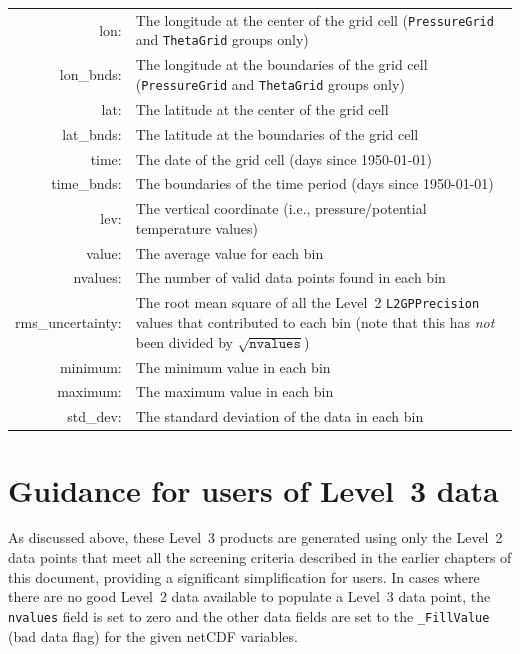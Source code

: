 \vspace{\baselineskip}\noindent\begin{tabular}{>{\ttfamily}r>{\raggedright}p{4.9in}}
  lon: & The longitude at the center of the grid cell
  (\texttt{PressureGrid} and \texttt{ThetaGrid} groups
  only)\tabularnewline

  lon\_bnds: & The longitude at the boundaries of the grid cell
  (\texttt{PressureGrid} and \texttt{ThetaGrid} groups
  only)\tabularnewline

  lat: & The latitude at the center of the grid cell\tabularnewline

  lat\_bnds: & The latitude at the boundaries of the grid
  cell\tabularnewline

  time: & The date of the grid cell (days since
  1950-01-01)\tabularnewline

  time\_bnds: & The boundaries of the time period (days since
  1950-01-01)\tabularnewline

  lev: & The vertical coordinate (i.e., pressure/potential temperature
  values)\tabularnewline

  value: & The average value for each bin\tabularnewline

  nvalues: & The number of valid data points found in each
  bin\tabularnewline

  rms\_uncertainty: & The root mean square of all the Level~2
  \texttt{L2GPPrecision} values that contributed to each bin (note
  that this has \emph{not} been divided by
  $\sqrt{\texttt{nvalues}}$)\tabularnewline

  minimum: & The minimum value in each bin\tabularnewline

  maximum: & The maximum value in each bin\tabularnewline

  std\_dev: & The standard deviation of the data in each
  bin\tabularnewline

\end{tabular}

\section{Guidance for users of Level~3 data}

As discussed above, these Level~3 products are generated using only the Level~2 data points that meet all the screening criteria described in the earlier chapters of this document, providing a significant simplification for users. In cases where there are no good Level~2 data available to populate a Level~3 data point, the \texttt{nvalues} field is set to zero and the other data fields are set to the \texttt{\_FillValue} (bad data flag) for the given netCDF variables.

